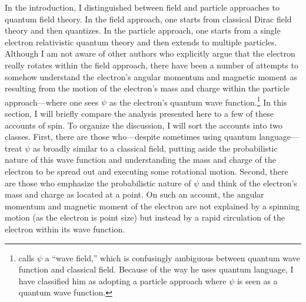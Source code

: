 \documentclass[onecolumn,secnumarabic,amsmath,amssymb,balancelastpage,nofootinbib]{article}
\begin{document}
In the introduction, I distinguished between field and particle approaches to quantum field theory.  In the field approach, one starts from classical Dirac field theory and then quantizes.  In the particle approach, one starts from a single electron relativistic quantum theory and then extends to multiple particles.  Although I am not aware of other authors who explicitly argue that the electron really rotates within the field approach, there have been a number of attempts to somehow understand the electron's angular momentum and magnetic moment as resulting from the motion of the electron's mass and charge within the particle approach---where one sees $\psi$ as the electron's quantum wave function.\footnote{\citet{ohanian} calls $\psi$ a ``wave field,'' which is confusingly ambiguous between quantum wave function and classical field.  Because of the way he uses quantum language, I have classified him as adopting a particle approach where $\psi$ is seen as a quantum wave function.}  In this section, I will briefly compare the analysis presented here to a few of these accounts of spin.  To organize the discussion, I will sort the accounts into two classes.  First, there are those who---despite sometimes using quantum language---treat $\psi$ as broadly similar to a classical field, putting aside the probabilistic nature of this wave function and understanding the mass and charge of the electron to be spread out and executing some rotational motion.  Second, there are those who emphasize the probabilistic nature of $\psi$ and think of the electron's mass and charge as located at a point.  On such an account, the angular momentum and magnetic moment of the electron are not explained by a spinning motion (as the electron is point size) but instead by a rapid circulation of the electron within its wave function.
\end{document}
